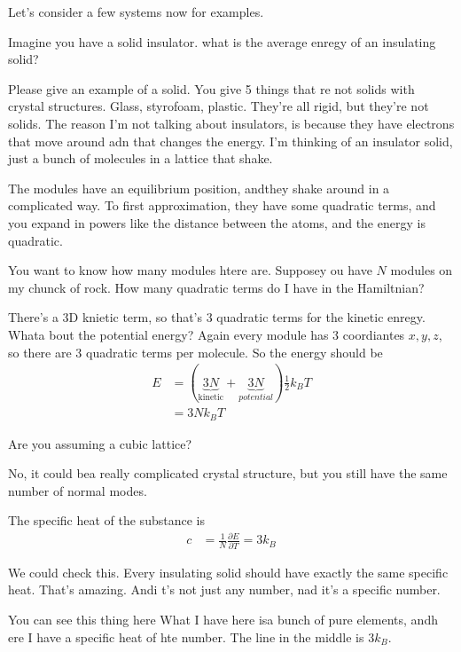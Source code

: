 Let's consider a few systems now for examples.

\begin{example}
    Imagine you have a solid insulator.
    what is the average enregy of an insulating solid?
\end{example}
Please give an example of a solid.
You give 5 things that re not solids with crystal structures.
Glass, styrofoam, plastic.
They're all rigid,
but they're not solids.
The reason I'm not talking about insulators,
is because they have electrons that move around adn that changes the energy.
I'm thinking of an insulator solid,
just a bunch of molecules in a lattice that shake.

The modules have an equilibrium position,
andthey shake around in a complicated way.
To first approximation,
they have some quadratic terms,
and you expand in powers like the distance between the atoms,
and the energy is quadratic.

You want to know how many modules htere are.
Supposey ou have $N$ modules on my chunck of rock.
How many quadratic terms do I have in the Hamiltnian?

There's a 3D knietic term,
so that's 3 quadratic terms for the kinetic enregy.
Whata bout the potential energy?
Again every module has 3 coordiantes $x,y,z$,
so there are 3 quadratic terms per molecule.
So the energy should be
\begin{align}
    E &= \left( 
    \underbrace{3N}_{\text{kinetic}}
    + \underbrace{3N}_{potential}
    \right)
    \frac{1}{2}k_B T\\
    &= 3Nk_B T
\end{align}

\begin{question}
    Are you assuming a cubic lattice?
\end{question}
No, it could bea really complicated crystal structure,
but you still have the same number of normal modes.

The specific heat of the substance is
\begin{align}
    c &= \frac{1}{N}\frac{\partial E}{\partial T} = 3k_B
\end{align}

We could check this.
Every insulating solid should have exactly the same specific heat.
That's amazing.
Andi t's not just any number,
nad it's a specific number.

You can see this thing here
What I have here isa bunch of pure elements,
andh ere I have a specific heat of hte number.
The line in  the middle is $3k_B$.

